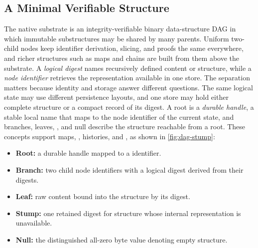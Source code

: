 \subsection{A Minimal Verifiable Structure}
\label{sec:minimal-structure}

The native substrate is an integrity-verifiable binary data-structure DAG in which immutable substructures may be shared by many parents. Uniform two-child nodes keep identifier derivation, slicing, and proofs the same everywhere, and richer structures such as maps and chains are built from them above the substrate. A \emph{logical digest} names recursively defined content or structure, while a \emph{node identifier} retrieves the representation available in one store. The separation matters because identity and storage answer different questions. The same logical state may use different persistence layouts, and one store may hold either complete structure or a compact record of its digest. A root is a \emph{durable handle}, a stable local name that maps to the node identifier of the current state, and branches, leaves, , and null describe the structure reachable from a root. These concepts support maps, , histories, and , as shown in \cref{fig:dag-stump}:

\begin{itemize}
  \item \textbf{Root:} a durable handle mapped to a  identifier.
  \item \textbf{Branch:} two child node identifiers with a logical digest derived from their digests.
  \item \textbf{Leaf:} raw content bound into the structure by its digest.
  \item \textbf{Stump:} one retained digest for structure whose internal representation is unavailable.
  \item \textbf{Null:} the distinguished all-zero byte value denoting empty structure.
\end{itemize}

